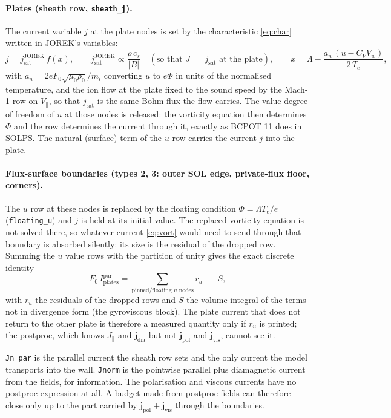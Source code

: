 \documentclass[11pt,a4paper]{article}
\newcommand{\Te}{T_e}
\newcommand{\cs}{c_s}
\newcommand{\jsat}{j_{\mathrm{sat}}}
\newcommand{\Jpar}{J_\parallel}
\newcommand{\jdia}{\mathbf{j}_{\mathrm{dia}}}
\newcommand{\jpol}{\mathbf{j}_{\mathrm{pol}}}
\newcommand{\jvis}{\mathbf{j}_{\mathrm{vis}}}
\newcommand{\code}[1]{\texttt{#1}}
\begin{document}
\paragraph{Plates (sheath row, \code{sheath\_j}).} The current variable $j$ at the plate nodes is set by the
characteristic \eqref{eq:char} written in JOREK's variables:
\begin{equation}
  j = \jsat^{\mathrm{JOREK}}\,f(x),\qquad
  \jsat^{\mathrm{JOREK}} \propto \frac{\rho\,\cs}{|B|}\quad(\text{so that } \Jpar = \jsat\text{ at the plate}),\qquad
  x = \Lambda - \frac{a_n\,(u - C_V V_w)}{2\,\Te},
  \label{eq:sheathrow}
\end{equation}
with $a_n = 2eF_0\sqrt{\mu_0\rho_0}/m_i$ converting $u$ to $e\Phi$ in units of the normalised temperature, and the ion
flow at the plate fixed to the sound speed by the Mach-1 row on $V_\parallel$, so that $\jsat$ is the same Bohm flux the
flow carries. The value degree of freedom of $u$ at those nodes is released: the vorticity equation then determines
$\Phi$ and the row determines the current through it, exactly as BCPOT 11 does in SOLPS. The natural (surface) term of
the $u$ row carries the current $j$ into the plate.

\paragraph{Flux-surface boundaries (types 2, 3: outer SOL edge, private-flux floor, corners).} The $u$ row at these nodes
is replaced by the floating condition $\Phi = \Lambda\Te/e$ (\code{floating\_u}) and $j$ is held at its initial value.
The replaced vorticity equation is not solved there, so whatever current \eqref{eq:vort} would need to send through
that boundary is absorbed silently: its size is the residual of the dropped row. Summing the $u$ value rows with the
partition of unity gives the exact discrete identity
\begin{equation}
  F_0\,I_{\mathrm{plates}}^{\mathrm{par}} = \sum_{\text{pinned/floating } u\text{ nodes}} r_u \;-\; S ,
  \label{eq:ground}
\end{equation}
with $r_u$ the residuals of the dropped rows and $S$ the volume integral of the terms not in divergence form (the
gyroviscous block). The plate current that does not return to the other plate is therefore a measured quantity only if
$r_u$ is printed; the postproc, which knows $\Jpar$ and $\jdia$ but not $\jpol$ and $\jvis$, cannot see it.

\begin{tcolorbox}[warn={Watch out: three different ``currents'' at the plate}]
\code{Jn\_par} is the parallel current the sheath row sets and the only current the model transports into the wall.
\code{Jnorm} is the pointwise parallel plus diamagnetic current from the fields, for information. The polarisation
and viscous currents have no postproc expression at all. A budget made from postproc fields can therefore close only up
to the part carried by $\jpol + \jvis$ through the boundaries.
\end{tcolorbox}
\end{document}
